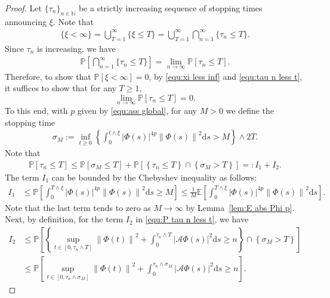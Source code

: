 \documentclass[11pt, reqno]{amsart}
\theoremstyle{definition}
\numberwithin{equation}{section}
\newcommand{\bb}{\mathbb}
\newcommand{\ds}{\mathrm{d}s}
\newcommand{\norm}[1]{\left\|{#1}\right\|}
\newcommand{\abs}[1]{\left|{#1}\right|}
\begin{document}
\begin{proof}
Let $\{\tau_n\}_{n\in\bb{N}}$ be a strictly increasing sequence of stopping times announcing $\xi$. Note that
\begin{align}\label{equ:xi less inf}
	\{\xi<\infty\} = \bigcup_{T=1}^\infty \{\xi\leq T\} = \bigcup_{T=1}^\infty \bigcap_{n=1}^\infty \{\tau_n\leq T\}.
\end{align}
Since $\tau_n$ is increasing, we have
\begin{align}\label{equ:tau n less t}
	\bb{P} \left[\bigcap_{n=1}^\infty \{\tau_n\leq T\} \right] 
	=
	\lim_{n\to \infty} \bb{P}\left[\tau_n \leq T\right].
\end{align}
Therefore, to show that $\bb{P}\left[\xi< \infty\right]=0$, by \eqref{equ:xi less inf} and \eqref{equ:tau n less t}, it suffices to show that for any $T\geq 1$,
\begin{equation}\label{equ:lim n P tau n}
	\lim_{n\to \infty} \bb{P}\left[\tau_n\leq T\right] = 0.
\end{equation}
To this end, with $p$ given by \eqref{equ:ass global}, for any $M>0$ we define the stopping time
\begin{align}\label{equ:sigma M}
	\sigma_M:= \inf_{t\geq 0} \left\{\int_0^{t\wedge\xi} \abs{\Phi(s)}^{4p} \norm{\Phi(s)}^2 \ds > M\right\} \wedge 2T.
\end{align}
Note that
\begin{align}\label{equ:P tau n less t}
	\bb{P} \left[\tau_n\leq T\right]
	\leq
	\bb{P} \left[\sigma_M\leq T\right]
	+
	\bb{P} \left[ \left\{\tau_n\leq T\right\} \cap \left\{\sigma_M>T\right\}\right] 
	 =: I_1+I_2.
\end{align}
The term $I_1$ can be bounded by the Chebyshev inequality as follows:
\begin{align}\label{equ:I1 P}
	I_1
	&\leq
	\bb{P} \left[\int_0^{T\wedge\xi} \abs{\Phi(s)}^{4p} \norm{\Phi(s)}^2 \ds \geq M\right] 
	\leq
	\frac{1}{M} \bb{E} \left[\int_0^{T\wedge\xi} \abs{\Phi(s)}^{4p} \norm{\Phi(s)}^2 \ds \right].
\end{align}
Note that the last term tends to zero as $M\to\infty$ by Lemma~\ref{lem:E abs Phi p}. Next, by definition, for the term $I_2$ in \eqref{equ:P tau n less t}, we have
\begin{align}\label{equ:I2 P}
	I_2 &\leq 
	\bb{P} \left[ \left\{ \sup_{t\in [0,\tau_n\wedge T]} \norm{\Phi(t)}^2 + \int_0^{\tau_n \wedge T} \abs{\mathcal{A} \Phi(s)}^2 \ds \geq n \right\} 
	\cap \left\{\sigma_M>T\right\}\right] 
	\nonumber\\
	&\leq
	\bb{P} \left[ \sup_{t\in [0,\tau_n\wedge \sigma_M]} \norm{\Phi(t)}^2 + \int_0^{\tau_n \wedge \sigma_M} \abs{\mathcal{A} \Phi(s)}^2 \ds \geq n \right].

\end{align}
\end{proof}
\end{document}
